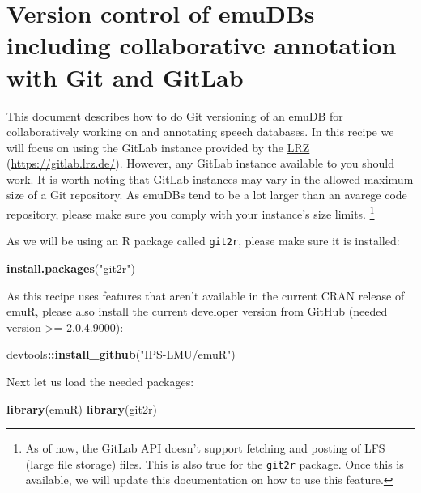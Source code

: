 \documentclass[]{book}
\newenvironment{Shaded}{\begin{snugshade}}{\end{snugshade}}
\newcommand{\KeywordTok}[1]{\textcolor[rgb]{0.13,0.29,0.53}{\textbf{#1}}}
\newcommand{\NormalTok}[1]{#1}
\newcommand{\OperatorTok}[1]{\textcolor[rgb]{0.81,0.36,0.00}{\textbf{#1}}}
\newcommand{\StringTok}[1]{\textcolor[rgb]{0.31,0.60,0.02}{#1}}
\begin{document}
\hypertarget{version-control-of-emudbs-including-collaborative-annotation-with-git-and-gitlab}{%
\chapter{Version control of emuDBs including collaborative annotation with Git and GitLab}\label{version-control-of-emudbs-including-collaborative-annotation-with-git-and-gitlab}}

This document describes how to do Git versioning of an emuDB for collaboratively working on and annotating speech databases. In this recipe we will focus on using the GitLab instance provided by the \href{https://www.lrz.de/}{LRZ} (\url{https://gitlab.lrz.de/}). However, any GitLab instance available to you should work. It is worth noting that GitLab instances may vary in the allowed maximum size of a Git repository. As emuDBs tend to be a lot larger than an avarege code repository, please make sure you comply with your instance's size limits. \footnote{As of now, the GitLab API doesn't support fetching and posting of LFS (large file storage) files. This is also true for the \texttt{git2r} package. Once this is available, we will update this documentation on how to use this feature.}

As we will be using an R package called \texttt{git2r}, please make sure it is installed:

\begin{Shaded}
\begin{Highlighting}[]
\KeywordTok{install.packages}\NormalTok{(}\StringTok{"git2r"}\NormalTok{)}
\end{Highlighting}
\end{Shaded}

As this recipe uses features that aren't available in the current CRAN release of emuR, please also install the current developer version from GitHub (needed version \textgreater{}= 2.0.4.9000):

\begin{Shaded}
\begin{Highlighting}[]
\NormalTok{devtools}\OperatorTok{::}\KeywordTok{install_github}\NormalTok{(}\StringTok{"IPS-LMU/emuR"}\NormalTok{)}
\end{Highlighting}
\end{Shaded}

Next let us load the needed packages:

\begin{Shaded}
\begin{Highlighting}[]
\KeywordTok{library}\NormalTok{(emuR)}
\KeywordTok{library}\NormalTok{(git2r)}
\end{Highlighting}
\end{Shaded}
\end{document}
